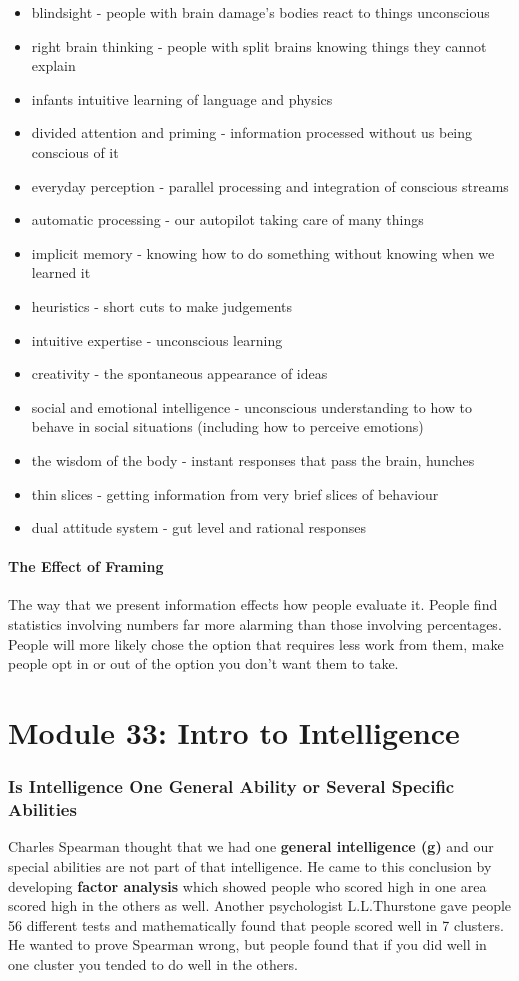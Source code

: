 \documentclass[12pt]{article}
\begin{document}
\begin{itemize}
\item blindsight - people with brain damage's bodies react to things unconscious
\item right brain thinking - people with split brains knowing things they cannot explain
\item infants intuitive learning of language and physics
\item divided attention and priming - information processed without us being conscious of it
\item everyday perception - parallel processing and integration of conscious streams
\item automatic processing - our autopilot taking care of many things
\item implicit memory - knowing how to do something without knowing when we learned it
\item heuristics - short cuts to make judgements
\item intuitive expertise - unconscious learning
\item creativity - the spontaneous appearance of ideas
\item social and emotional intelligence - unconscious understanding to how to behave in social situations (including how to perceive emotions)
\item the wisdom of the body - instant responses that pass the brain, hunches
\item thin slices - getting information from very brief slices of behaviour
\item dual attitude system - gut level and rational responses
\end{itemize}
\subsection*{The Effect of Framing} The way that we present information effects how people evaluate it. People find statistics involving numbers far more alarming than those involving percentages. People will more likely chose the option that requires less work from them, make people opt in or out of the option you don't want them to take.

\part*{Module 33: Intro to Intelligence}
\section*{Is Intelligence One General Ability or Several Specific Abilities}
Charles Spearman thought that we had one \textbf{general intelligence (g)} and our special abilities are not part of that intelligence. He came to this conclusion by developing \textbf{factor analysis} which showed people who scored high in one area scored high in the others as well. Another psychologist L.L.Thurstone gave people 56 different tests and mathematically found that people scored well in 7 clusters. He wanted to prove Spearman wrong, but people found that if you did well in one cluster you tended to do well in the others. 
\end{document}
